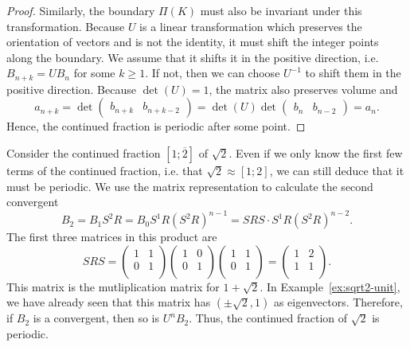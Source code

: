 \begin{proof}
  Similarly, the boundary $Π(K)$ must also be invariant under this transformation.
  Because $U$ is a linear transformation which preserves the orientation of
  vectors and is not the identity, it must shift the integer points along the
  boundary.
  We assume that it shifts it in the positive direction,
  i.e. $B_{n+k} = U B_n$ for some $k ≥ 1$.
  If not, then we can choose $U^{-1}$ to shift them in the positive direction.
  Because $\det(U) = 1$, the matrix also preserves volume and
  \[
    a_{n+k}
    = \det\begin{pmatrix}
      b_{n+k} & b_{n+k-2}
    \end{pmatrix}
    = \det(U) \det\begin{pmatrix}
      b_n & b_{n-2}
    \end{pmatrix}
    = a_n.
  \]
  Hence, the continued fraction is periodic after some point.
\end{proof}

\begin{example}
  Consider the continued fraction $[1; \overline{2}]$ of $\sqrt{2}$.
  Even if we only know the first few terms of the continued fraction, i.e. that
  $\sqrt{2} ≈ [1; 2]$, we can still deduce that it must be periodic.
  We use the matrix representation to calculate the second convergent
  \[
    B_2 = B_1 S^2 R = B_0 S^1 R (S^2 R)^{n-1} = SRS · S^1 R (S^2 R)^{n-2}.
  \]
  The first three matrices in this product are
  \[
    SRS =
    \begin{pmatrix}
      1 & 1 \\
      0 & 1 \\
    \end{pmatrix}
    \begin{pmatrix}
      1 & 0 \\
      0 & 1 \\
    \end{pmatrix}
    \begin{pmatrix}
      1 & 1 \\
      0 & 1 \\
    \end{pmatrix}
    =
    \begin{pmatrix}
      1 & 2 \\
      1 & 1 \\
    \end{pmatrix}.
  \]
  This matrix is the mutliplication matrix for $1 + \sqrt{2}$.
  In Example~\vref{ex:sqrt2-unit},
  we have already seen that this matrix has $(±\sqrt{2}, 1)$ as eigenvectors.
  Therefore, if $B_2$ is a convergent, then so is $U^n B_2$.
  Thus, the continued fraction of $\sqrt{2}$ is periodic.
\end{example}
